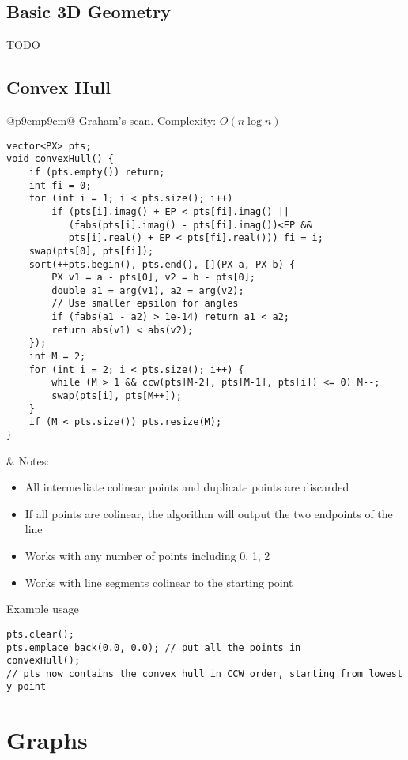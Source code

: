 \documentclass[letterpaper]{article}
\begin{document}
\subsection{Basic 3D Geometry}

TODO

\clearpage
\subsection{Convex Hull}

\begin{tabular}{@{}p{9cm}p{9cm}@{}}
Graham's scan. Complexity: $O\left(n\log n\right)$

\begin{lstlisting}
vector<PX> pts;
void convexHull() {
	if (pts.empty()) return;
	int fi = 0;
	for (int i = 1; i < pts.size(); i++)
		if (pts[i].imag() + EP < pts[fi].imag() || 
		   (fabs(pts[i].imag() - pts[fi].imag())<EP &&
		   pts[i].real() + EP < pts[fi].real())) fi = i;
	swap(pts[0], pts[fi]);
	sort(++pts.begin(), pts.end(), [](PX a, PX b) {
		PX v1 = a - pts[0], v2 = b - pts[0];
		double a1 = arg(v1), a2 = arg(v2);
		// Use smaller epsilon for angles
		if (fabs(a1 - a2) > 1e-14) return a1 < a2;
		return abs(v1) < abs(v2);
	});
	int M = 2;
	for (int i = 2; i < pts.size(); i++) {
		while (M > 1 && ccw(pts[M-2], pts[M-1], pts[i]) <= 0) M--;
		swap(pts[i], pts[M++]);
	}
	if (M < pts.size()) pts.resize(M);
}
\end{lstlisting}
&
Notes:
\begin{itemize}
\item All intermediate colinear points and duplicate points are discarded
\item If all points are colinear, the algorithm will output the two endpoints of the line
\item Works with any number of points including 0, 1, 2
\item Works with line segments colinear to the starting point
\end{itemize}
\end{tabular}

Example usage
\begin{lstlisting}
pts.clear();
pts.emplace_back(0.0, 0.0); // put all the points in
convexHull();
// pts now contains the convex hull in CCW order, starting from lowest y point
\end{lstlisting}

\clearpage

\section{Graphs}
\end{document}
